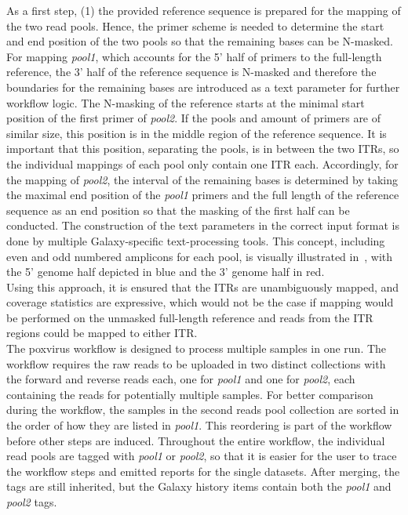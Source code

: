 As a first step, (1) the provided reference sequence is prepared for the mapping of the two read pools. Hence, the primer scheme is needed to determine the start and end position of the two pools so that the remaining bases can be N-masked. For mapping \textit{pool1}, which accounts for the 5' half of primers to the full-length reference, the 3' half of the reference sequence is N-masked and therefore the boundaries for the remaining bases are introduced as a text parameter for further workflow logic. The N-masking of the reference starts at the minimal start position of the first primer of \textit{pool2}. If the pools and amount of primers are of similar size, this position is in the middle region of the reference sequence. It is important that this position, separating the pools, is in between the two \acp{ITR}, so the individual mappings of each pool only contain one \ac{ITR} each. Accordingly, for the mapping of \textit{pool2}, the interval of the remaining bases is determined by taking the maximal end position of the \textit{pool1} primers and the full length of the reference sequence as an end position so that the masking of the first half can be conducted. The construction of the text parameters in the correct input format is done by multiple Galaxy-specific text-processing tools. This concept, including even and odd numbered amplicons for each pool, is visually illustrated in~, with the 5' genome half depicted in blue and the 3' genome half in red. \\
Using this approach, it is ensured that the \acp{ITR} are unambiguously mapped, and coverage statistics are expressive, which would not be the case if mapping would be performed on the unmasked full-length reference and reads from the \ac{ITR} regions could be mapped to either \ac{ITR}.\\
The poxvirus workflow is designed to process multiple samples in one run. The workflow requires the raw reads to be uploaded in two distinct collections with the forward and reverse reads each, one for \textit{pool1} and one for \textit{pool2}, each containing the reads for potentially multiple samples. For better comparison during the workflow, the samples in the second reads pool collection are sorted in the order of how they are listed in \textit{pool1}. This reordering is part of the workflow before other steps are induced. Throughout the entire workflow, the individual read pools are tagged with \textit{pool1} or \textit{pool2}, so that it is easier for the user to trace the workflow steps and emitted reports for the single datasets. After merging, the tags are still inherited, but the Galaxy history items contain both the \textit{pool1} and \textit{pool2} tags.\\
